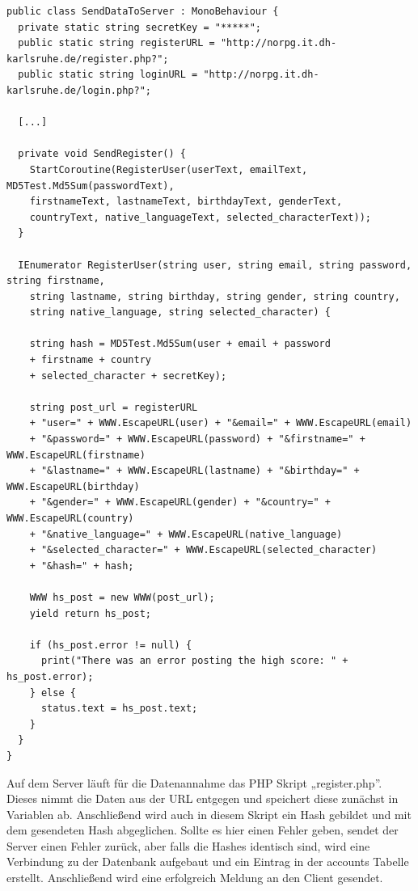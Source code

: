 			\begin{scriptsize}
				\lstset{
					float,
					caption=Skript: SendDataToServer.cs, 
					language=[Sharp]C, 
					frame=single,  
					showstringspaces=false, 
					showspaces=false, 
					numbers=left, 
					captionpos=b, 
					belowcaptionskip=4pt,
					basicstyle=\ttfamily
				} 
				\begin{lstlisting}[label=lst:c_SendDataToServer]
public class SendDataToServer : MonoBehaviour {
  private static string secretKey = "*****";
  public static string registerURL = "http://norpg.it.dh-karlsruhe.de/register.php?";
  public static string loginURL = "http://norpg.it.dh-karlsruhe.de/login.php?";

  [...]
	
  private void SendRegister() {
    StartCoroutine(RegisterUser(userText, emailText, MD5Test.Md5Sum(passwordText), 
    firstnameText, lastnameText, birthdayText, genderText, 
    countryText, native_languageText, selected_characterText));
  }
	
  IEnumerator RegisterUser(string user, string email, string password, string firstname, 
    string lastname, string birthday, string gender, string country, 
    string native_language, string selected_character) {
	
    string hash = MD5Test.Md5Sum(user + email + password 
    + firstname + country 
    + selected_character + secretKey);

    string post_url = registerURL
    + "user=" + WWW.EscapeURL(user) + "&email=" + WWW.EscapeURL(email)
    + "&password=" + WWW.EscapeURL(password) + "&firstname=" + WWW.EscapeURL(firstname)
    + "&lastname=" + WWW.EscapeURL(lastname) + "&birthday=" + WWW.EscapeURL(birthday)
    + "&gender=" + WWW.EscapeURL(gender) + "&country=" + WWW.EscapeURL(country)
    + "&native_language=" + WWW.EscapeURL(native_language)
    + "&selected_character=" + WWW.EscapeURL(selected_character)
    + "&hash=" + hash;
    
    WWW hs_post = new WWW(post_url);
    yield return hs_post;

    if (hs_post.error != null) {
      print("There was an error posting the high score: " + hs_post.error);
    } else {
      status.text = hs_post.text;
    }
  }
}
				\end{lstlisting}
			\end{scriptsize}

			Auf dem Server läuft für die Datenannahme das PHP Skript „register.php”. Dieses nimmt die Daten aus der URL entgegen und speichert diese zunächst in Variablen ab. Anschließend wird auch in diesem Skript ein Hash gebildet und mit dem gesendeten Hash abgeglichen. Sollte es hier einen Fehler geben, sendet der Server einen Fehler zurück, aber falls die Hashes identisch sind, wird eine Verbindung zu der Datenbank aufgebaut und ein Eintrag in der accounts Tabelle erstellt. Anschließend wird eine erfolgreich Meldung an den Client gesendet.

